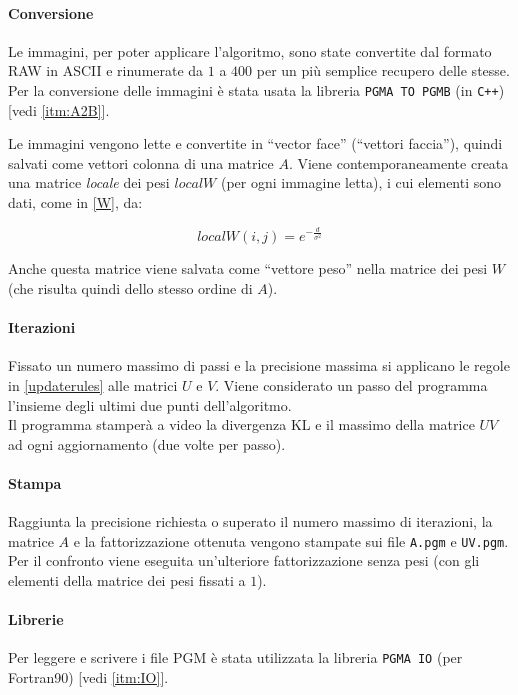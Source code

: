 \documentclass[a4paper]{article} %
\begin{document}
\paragraph{Conversione}\label{paragr:conversione}
Le immagini, per poter applicare l'algoritmo, sono state convertite dal formato RAW in ASCII e rinumerate da $1$ a $400$ per un più semplice recupero delle stesse. Per la conversione delle immagini è stata usata la libreria \texttt{PGMA TO PGMB} (in \texttt{C++}) [vedi \ref{itm:A2B}].

Le immagini vengono lette e convertite in ``vector face'' (``vettori faccia''), quindi salvati come vettori colonna di una matrice $A$. Viene contemporaneamente creata una matrice \emph{locale} dei pesi $localW$ (per ogni immagine letta), i cui elementi sono dati, come in \ref{W}, da:

\[ localW(i,j) = e^{-\frac{d}{\sigma^2}} \]

Anche questa matrice viene salvata come ``vettore peso'' nella matrice dei pesi $W$ (che risulta quindi dello stesso ordine di $A$).

\paragraph{Iterazioni}
Fissato un numero massimo di passi e la precisione massima si applicano le regole in \ref{updaterules} alle matrici $U$ e $V$. Viene considerato un passo del programma l'insieme degli ultimi due punti dell'algoritmo.\\
Il programma stamperà a video la divergenza KL e il massimo della matrice $UV$ ad ogni aggiornamento (due volte per passo).

\paragraph{Stampa}
Raggiunta la precisione richiesta o superato il numero massimo di iterazioni, la matrice $A$ e la fattorizzazione ottenuta vengono stampate sui file \texttt{A.pgm} e \texttt{UV.pgm}.
Per il confronto viene eseguita un'ulteriore fattorizzazione senza pesi (con gli elementi della matrice dei pesi fissati a $1$).

\paragraph{Librerie}
Per leggere e scrivere i file PGM è stata utilizzata la libreria \texttt{PGMA IO} (per Fortran90) [vedi \ref{itm:IO}].
\end{document}
